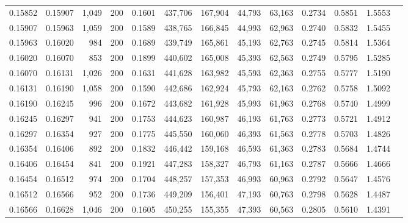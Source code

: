 \begin{tabular}{rrrrrrrrrrrrr}
0.15852 & 0.15907 & 1,049 & 200 &                                     0.1601 & 437,706 & 167,904 &  44,793 &  63,163 & 0.2734 & 0.5851 & 1.5553 \\
0.15907 & 0.15963 & 1,059 & 200 &                                     0.1589 & 438,765 & 166,845 &  44,993 &  62,963 & 0.2740 & 0.5832 & 1.5455 \\
0.15963 & 0.16020 &   984 & 200 &                                     0.1689 & 439,749 & 165,861 &  45,193 &  62,763 & 0.2745 & 0.5814 & 1.5364 \\
0.16020 & 0.16070 &   853 & 200 &                                     0.1899 & 440,602 & 165,008 &  45,393 &  62,563 & 0.2749 & 0.5795 & 1.5285 \\
0.16070 & 0.16131 & 1,026 & 200 &                                     0.1631 & 441,628 & 163,982 &  45,593 &  62,363 & 0.2755 & 0.5777 & 1.5190 \\
0.16131 & 0.16190 & 1,058 & 200 &                                     0.1590 & 442,686 & 162,924 &  45,793 &  62,163 & 0.2762 & 0.5758 & 1.5092 \\
0.16190 & 0.16245 &   996 & 200 &                                     0.1672 & 443,682 & 161,928 &  45,993 &  61,963 & 0.2768 & 0.5740 & 1.4999 \\
0.16245 & 0.16297 &   941 & 200 &                                     0.1753 & 444,623 & 160,987 &  46,193 &  61,763 & 0.2773 & 0.5721 & 1.4912 \\
0.16297 & 0.16354 &   927 & 200 &                                     0.1775 & 445,550 & 160,060 &  46,393 &  61,563 & 0.2778 & 0.5703 & 1.4826 \\
0.16354 & 0.16406 &   892 & 200 &                                     0.1832 & 446,442 & 159,168 &  46,593 &  61,363 & 0.2783 & 0.5684 & 1.4744 \\
0.16406 & 0.16454 &   841 & 200 &                                     0.1921 & 447,283 & 158,327 &  46,793 &  61,163 & 0.2787 & 0.5666 & 1.4666 \\
0.16454 & 0.16512 &   974 & 200 &                                     0.1704 & 448,257 & 157,353 &  46,993 &  60,963 & 0.2792 & 0.5647 & 1.4576 \\
0.16512 & 0.16566 &   952 & 200 &                                     0.1736 & 449,209 & 156,401 &  47,193 &  60,763 & 0.2798 & 0.5628 & 1.4487 \\
0.16566 & 0.16628 & 1,046 & 200 &                                     0.1605 & 450,255 & 155,355 &  47,393 &  60,563 & 0.2805 & 0.5610 & 1.4391 \\

\end{tabular}
